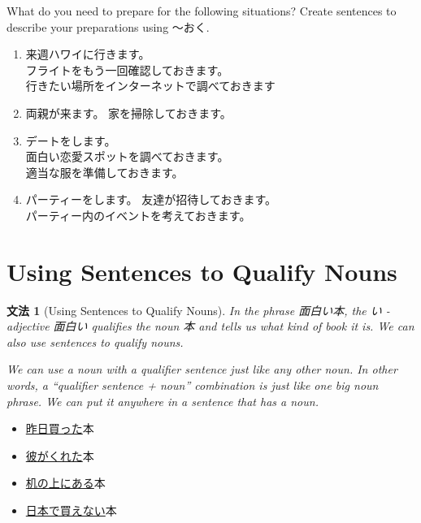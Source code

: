 \documentclass[notoc,notitlepage]{tufte-book}
\newtheorem{grammar}{文法}[section]
\begin{document}
\begin{ex}
  What do you need to prepare for the following situations? Create sentences to describe your preparations using 〜おく.

  \begin{enumerate}
    \item 来週ハワイに行きます。\\
      フライトをもう一回確認しておきます。\\
      行きたい場所をインターネットで調べておきます
    \item 両親が来ます。
      家を掃除しておきます。
    \item デートをします。\\
      面白い恋愛スポットを調べておきます。\\
      適当な服を準備しておきます。
    \item パーティーをします。
      友達が招待しておきます。\\
      パーティー内のイベントを考えておきます。
  \end{enumerate}
\end{ex}


\section{Using Sentences to Qualify Nouns}%
\label{sec:using_sentences_to_qualify_nouns}

\begin{grammar}[Using Sentences to Qualify Nouns]
\label{grammar:using_sentences_to_qualify_nouns}
  In the phrase 面白い本, the い -adjective 面白い qualifies the noun 本 and tells us what kind of book it is. We can also use sentences to qualify nouns.

  We can use a noun with a qualifier sentence just like any other noun. In other words, a ``qualifier sentence + noun'' combination is just like one big noun phrase. We can put it anywhere in a sentence that has a noun.
\end{grammar}

\begin{eg}
  \begin{itemize}
    \item \underline{昨日買った}本
    \item \underline{彼がくれた}本
    \item \underline{机の上にある}本
    \item \underline{日本で買えない}本
  \end{itemize}
\end{eg}
\end{document}
